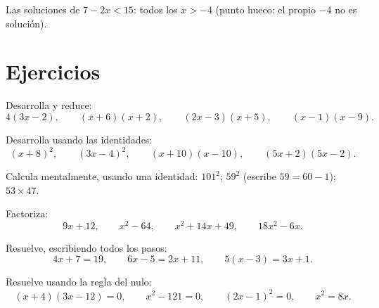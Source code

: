 \begin{omfigure}

{\small Las soluciones de $7 - 2x < 15$: todos los $x > -4$ (punto hueco: el propio
$-4$ no es solución).}
\end{omfigure}

\section{Ejercicios}

\begin{exercise}[$\star$]\label{exo:g9:algebra:1}
Desarrolla y reduce:
\[
4(3x - 2), \qquad
(x + 6)(x + 2), \qquad
(2x - 3)(x + 5), \qquad
(x - 1)(x - 9).
\]
\end{exercise}

\begin{exercise}[$\star$]\label{exo:g9:algebra:2}
Desarrolla usando las identidades:
\[
(x + 8)^2, \qquad
(3x - 4)^2, \qquad
(x + 10)(x - 10), \qquad
(5x + 2)(5x - 2).
\]
\end{exercise}

\begin{exercise}[$\star$]\label{exo:g9:algebra:3}
Calcula mentalmente, usando una identidad: $101^2$; \quad $59^2$
(escribe $59 = 60 - 1$); \quad $53 \times 47$.
\end{exercise}

\begin{exercise}[$\star$]\label{exo:g9:algebra:4}
Factoriza:
\[
9x + 12, \qquad
x^2 - 64, \qquad
x^2 + 14x + 49, \qquad
18x^2 - 6x .
\]
\end{exercise}

\begin{exercise}[$\star$]\label{exo:g9:algebra:5}
Resuelve, escribiendo todos los pasos:
\[
4x + 7 = 19, \qquad
6x - 5 = 2x + 11, \qquad
5(x - 3) = 3x + 1 .
\]
\end{exercise}

\begin{exercise}[$\star\star$]\label{exo:g9:algebra:6}
Resuelve usando la regla del  nulo:
\[
(x + 4)(3x - 12) = 0, \qquad
x^2 - 121 = 0, \qquad
(2x - 1)^2 = 0, \qquad
x^2 = 8x .
\]
\end{exercise}

